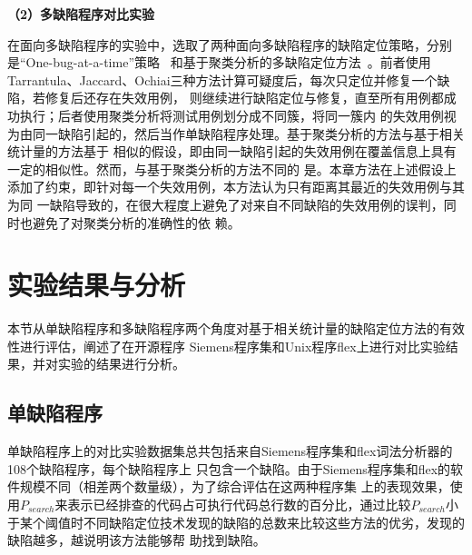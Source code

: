 \textbf{（2）多缺陷程序对比实验}

在面向多缺陷程序的实验中，选取了两种面向多缺陷程序的缺陷定位策略，分别是``One-bug-at-a-time''策略
~\cite{klahr1988cognitive}和基于聚类分析的多缺陷定位方法~\cite{jones2007debugging}。前者使用
Tarrantula、Jaccard、Ochiai三种方法计算可疑度后，每次只定位并修复一个缺陷，若修复后还存在失效用例，
则继续进行缺陷定位与修复，直至所有用例都成功执行；后者使用聚类分析将测试用例划分成不同簇，将同一簇内
的失效用例视为由同一缺陷引起的，然后当作单缺陷程序处理。基于聚类分析的方法与基于相关统计量的方法基于
相似的假设，即由同一缺陷引起的失效用例在覆盖信息上具有一定的相似性。然而，与基于聚类分析的方法不同的
是。本章方法在上述假设上添加了约束，即针对每一个失效用例，本方法认为只有距离其最近的失效用例与其为同
一缺陷导致的，在很大程度上避免了对来自不同缺陷的失效用例的误判，同时也避免了对聚类分析的准确性的依
赖。

\section{实验结果与分析}
本节从单缺陷程序和多缺陷程序两个角度对基于相关统计量的缺陷定位方法的有效性进行评估，阐述了在开源程序
Siemens程序集和Unix程序flex上进行对比实验结果，并对实验的结果进行分析。

\subsection{单缺陷程序}
单缺陷程序上的对比实验数据集总共包括来自Siemens程序集和flex词法分析器的108个缺陷程序，每个缺陷程序上
只包含一个缺陷。由于Siemens程序集和flex的软件规模不同（相差两个数量级），为了综合评估在这两种程序集
上的表现效果，使用$P_{search}$来表示已经排查的代码占可执行代码总行数的百分比，通过比较$P_{search}$小
于某个阈值时不同缺陷定位技术发现的缺陷的总数来比较这些方法的优劣，发现的缺陷越多，越说明该方法能够帮
助找到缺陷。

